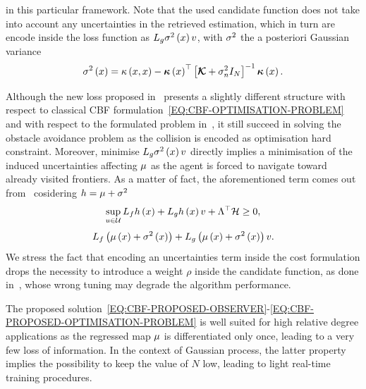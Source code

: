 in this particular framework. Note that the used candidate function does not take into account any uncertainties in the
retrieved estimation, which in turn are encode inside the loss function as $L_{g} \sigma^2 \left( x \right) v$, with
$\sigma^2$ the a posteriori Gaussian variance
\begin{equation*}
	\sigma^2 \left( x \right) = \kappa \left( x,x \right) - \boldsymbol{\kappa} \left( x \right)^{\top} \left[ \boldsymbol{\mathcal{K}} + \sigma_n^2 I_N \right]^{-1} \boldsymbol{\kappa} \left( x \right).
\end{equation*}
\begin{remark}
    Although the new loss proposed in~ presents a slightly different structure
    with respect to classical CBF formulation~\eqref{EQ:CBF-OPTIMISATION-PROBLEM} and with respect to the formulated
    problem in~, it still succeed in solving the obstacle avoidance problem as the
    collision is encoded as optimisation hard constraint. Moreover, minimise $L_{g} \sigma^2 \left( x \right) v$ directly
    implies a minimisation of the induced uncertainties affecting $\mu$ as the agent is forced to navigate toward already
    visited frontiers. As a matter of fact, the aforementioned term comes out from~ cosidering
    $h = \mu + \sigma^2$
    \begin{equation*}
        \sup_{u \in \mathcal{U}} L_{f} h \left( x \right) + L_{g} h \left( x \right) v + \Lambda^{\top}\mathcal{H} \ge 0,
    \end{equation*}
    \begin{equation*}
        L_{f} \left( \mu \left( x \right) + \sigma^2 \left( x \right) \right) + L_{g} \left( \mu \left( x \right) + \sigma^2 \left( x \right) \right) v.
    \end{equation*}
    We stress the fact that encoding an uncertainties term inside the cost formulation drops the necessity to introduce a weight $\rho$
    inside the candidate function, as done in~\cite{khan2022gaussian}, whose wrong tuning may degrade the algorithm performance.
\end{remark}
\begin{remark}
    The proposed solution~\eqref{EQ:CBF-PROPOSED-OBSERVER}-\eqref{EQ:CBF-PROPOSED-OPTIMISATION-PROBLEM} is well suited for
    high relative degree applications as the regressed map $\mu$ is differentiated only once, leading to a very few loss of
    information. In the context of Gaussian process, the latter property implies the possibility to keep the value of $N$ low,
    leading to light real-time training procedures.
\end{remark}
